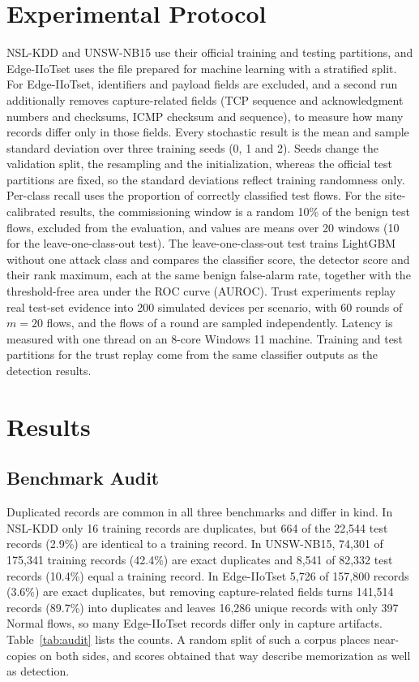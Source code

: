 \documentclass[journal]{IEEEtran}
\begin{document}
\section{Experimental Protocol}\label{sec:setup}
NSL-KDD \cite{tavallaee2009detailed} and UNSW-NB15 \cite{moustafa2015unsw} use their official training and testing partitions, and Edge-IIoTset \cite{ferrag2022edge} uses the file prepared for machine learning with a stratified split. For Edge-IIoTset, identifiers and payload fields are excluded, and a second run additionally removes capture-related fields (TCP sequence and acknowledgment numbers and checksums, ICMP checksum and sequence), to measure how many records differ only in those fields. Every stochastic result is the mean and sample standard deviation over three training seeds (0, 1 and 2). Seeds change the validation split, the resampling and the initialization, whereas the official test partitions are fixed, so the standard deviations reflect training randomness only. Per-class recall uses the proportion of correctly classified test flows. For the site-calibrated results, the commissioning window is a random 10\% of the benign test flows, excluded from the evaluation, and values are means over 20 windows (10 for the leave-one-class-out test). The leave-one-class-out test trains LightGBM without one attack class and compares the classifier score, the detector score and their rank maximum, each at the same benign false-alarm rate, together with the threshold-free area under the ROC curve (AUROC). Trust experiments replay real test-set evidence into 200 simulated devices per scenario, with 60 rounds of $m=20$ flows, and the flows of a round are sampled independently. Latency is measured with one thread on an 8-core Windows 11 machine. Training and test partitions for the trust replay come from the same classifier outputs as the detection results.

\section{Results}\label{sec:results}
\subsection{Benchmark Audit}
Duplicated records are common in all three benchmarks and differ in kind. In NSL-KDD only 16 training records are duplicates, but 664 of the 22,544 test records (2.9\%) are identical to a training record. In UNSW-NB15, 74,301 of 175,341 training records (42.4\%) are exact duplicates and 8,541 of 82,332 test records (10.4\%) equal a training record. In Edge-IIoTset 5,726 of 157,800 records (3.6\%) are exact duplicates, but removing capture-related fields turns 141,514 records (89.7\%) into duplicates and leaves 16,286 unique records with only 397 Normal flows, so many Edge-IIoTset records differ only in capture artifacts. Table~\ref{tab:audit} lists the counts. A random split of such a corpus places near-copies on both sides, and scores obtained that way describe memorization as well as detection.
\end{document}
